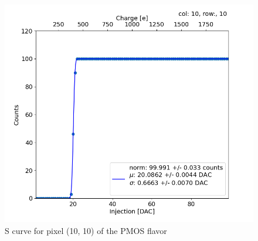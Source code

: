    
        \begin{figure}[h!]
            \centering
            \includegraphics[width=.6\linewidth]{figures/charaterization/scurve.png}
            \caption{S curve for pixel (10, 10) of the PMOS flavor}
            \label{fig:scurve}
        \end{figure}   
        
